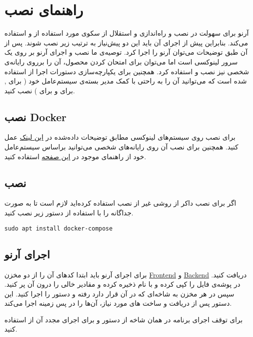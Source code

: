 \chapter{راهنمای نصب}

آرنو برای سهولت در نصب و راه‌اندازی و استقلال از سکوی مورد استفاده از  و  استفاده می‌کند.
بنابراین پیش از اجرای آن باید این دو پیش‌نیاز به ترتیب زیر نصب شوند. پس از آن طبق توضیحات می‌توان آرنو را اجرا کرد.
توصیه‌ی ما نصب و اجرای آرنو بر روی یک سرور لینوکسی است اما می‌توان برای امتحان کردن محصول، آن را برروی رایانه‌ی شخصی نیز نصب و استفاده کرد.
همچنین برای یکپارچه‌سازی دستورات اجرا از  استفاده شده است که می‌توانید آن را به راحتی با کمک مدیر بسته‌ی سیستم‌عامل خود ( برای ,  برای  و  برای ) نصب کنید.

\section{نصب Docker}

برای نصب  روی سیستم‌های لینوکسی مطابق توضیحات داده‌شده در \href{https://docs.docker.com/compose/install/compose-plugin/#install-using-the-repository}{این لینک} عمل کنید. 
همچنین برای نصب آن روی رایانه‌های شخصی می‌توانید براساس سیستم‌عامل خود از راهنمای موجود در \href{https://docs.docker.com/get-docker/}{این صفحه} استفاده کنید.

\section{نصب }

اگر برای نصب داکر از روشی غیر از نصب  استفاده کرده‌اید لازم است تا به صورت جداگانه  را با استفاده از دستور زیر نصب کنید.
\lstset{language=Bash}
\lstset{frame=lines}
\begin{latin}
\begin{lstlisting}
sudo apt install docker-compose
\end{lstlisting}
\end{latin}

\section{اجرای آرنو}

برای اجرای آرنو باید ابتدا کدهای آن را از دو مخزن
\href{https://github.com/Arno-Project/Frontend}{Frontend} و
\href{https://github.com/Arno-Project/Backend}{Backend}
دریافت کنید.
در پوشه‌ی  فایل  را کپی کرده و با نام  ذخیره کرده و مقادیر خالی را درون آن پر کنید.
سپس در هر مخزن به شاخه‌ای که  در آن قرار دارد رفته و دستور  را اجرا کنید.
این دستور پس از دریافت و ساخت  های مورد نیاز، آن‌ها را در پس زمینه اجرا می‌کند.

برای توقف اجرای برنامه در همان شاخه از دستور  و برای اجرای مجدد آن از  استفاده کنید.
